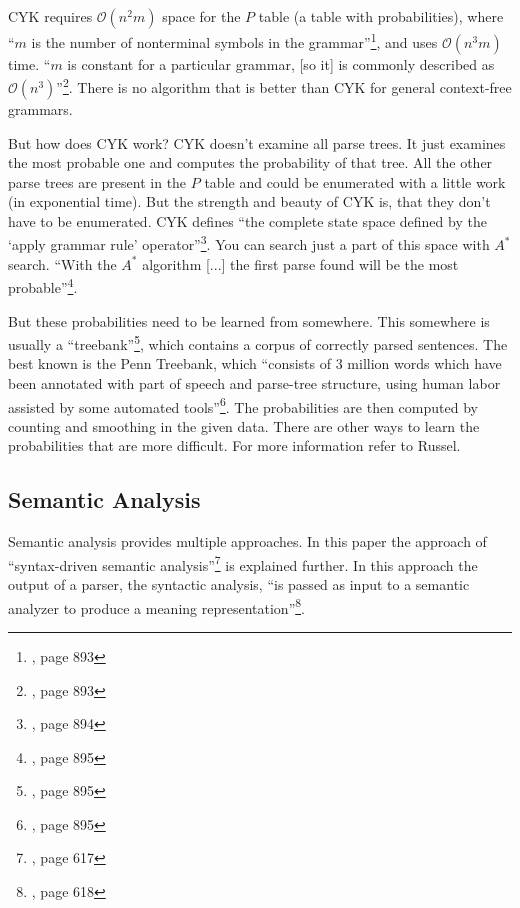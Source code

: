 \documentclass[12pt,twoside]{scrartcl}
\theoremstyle{plain}
\theoremstyle{definition}
\theoremstyle{remark}
\begin{document}
		CYK requires $\mathcal{O}(n^{2}m)$ space for the $P$ table (a table with probabilities), where ``$m$ is the number of nonterminal symbols in the grammar''\footnote{\cite{Russel2010}, page 893}, and uses $\mathcal{O}(n^{3}m)$ time. ``$m$ is constant for a particular grammar, [so it] is commonly described as $\mathcal{O}(n^{3})$''\footnote{\cite{Russel2010}, page 893}. There is no algorithm that is better than CYK for general context-free grammars\cite{Russel2010}. 
		
		But how does CYK work? CYK doesn't examine all parse trees. It just examines the most probable one and computes the probability of that tree. All the other parse trees are present in the $P$ table and could be enumerated with a little work (in exponential time). But the strength and beauty of CYK is, that they don't have to be enumerated. CYK defines ``the complete state space defined by the `apply grammar rule' operator''\footnote{\cite{Russel2010}, page 894}. You can search just a part of this space with $A^{*}$ search.\cite{Russel2010} ``With the $A^{*}$ algorithm [...] the first parse found will be the most probable''\footnote{\cite{Russel2010}, page 895}.
		
		But these probabilities need to be learned from somewhere. This somewhere is usually a ``treebank''\footnote{\cite{Russel2010}, page 895}, which contains a corpus of correctly parsed sentences. The best known is the Penn Treebank\cite{Russel2010}, which ``consists of 3 million words which have been annotated with part of speech and parse-tree structure, using human labor assisted by some automated tools''\footnote{\cite{Russel2010}, page 895}. The probabilities are then computed by counting and smoothing in the given data.\cite{Russel2010} There are other ways to learn the probabilities that are more difficult. For more information refer to Russel\cite{Russel2010}.
		
	\subsection{Semantic Analysis}
	\label{subSec:semanticAnalysis}
	
		Semantic analysis provides multiple approaches. In this paper the approach of ``syntax-driven semantic analysis''\footnote{\cite{Jurafsky2009}, page 617} is explained further. In this approach the output of a parser, the syntactic analysis, ``is passed as input to a semantic analyzer to produce a meaning representation''\footnote{\cite{Jurafsky2009}, page 618}.
\end{document}
